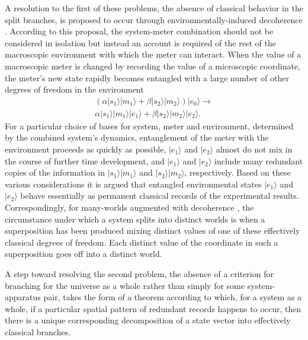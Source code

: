 \documentclass[twocolumn,amsmath,amssymb]{revtex4-1}
\begin{document}
A resolution to the first of these problems, the absence of 
classical behavior in the split branches, is proposed to occur through environmentally-induced decoherence 
\cite{Zeh, Zurek, Zurek1, Zurek2}.
According to this proposal, the system-meter combination should not be considered in isolation
but instead an account is required of the rest of the macroscopic environment with which the meter can interact.
When the value of a macroscopic meter is changed by recording the value of a microscopic coordinate, the meter's new state
rapidly becomes entangled with a large number of other degrees of freedom in the environment 
\begin{multline}
\label{entangled}
(\alpha |s_1 \rangle  |m_1 \rangle  + \beta |s_2 \rangle  |m_2 \rangle ) |e_0 \rangle  \rightarrow \\
\alpha|s_1 \rangle  |m_1 \rangle  |e_1 \rangle  +  \beta |s_2 \rangle  |m_2 \rangle  |e_2 \rangle . 
\end{multline}
For a particular choice of bases for system, meter and environment, determined by the combined system's dynamics, entanglement
of the meter with the environment proceeds as quickly as possible,
$| e_1 \rangle $ and $| e_2 \rangle $ almost do not mix in the course of further time development,
and $|e_1 \rangle $ and $|e_2 \rangle $ include many redundant copies
of the information in $|s_1 \rangle  |m_1 \rangle $ and $|s_2 \rangle  |m_2 \rangle $, respectively.
Based on these various considerations it is argued that entangled environmental states
$|e_1 \rangle $ and $|e_2 \rangle $
behave essentially as permanent classical records of the experimental results.
Correspondingly, for many-worlds augmented with decoherence \cite{Wallace}, the circumstance 
under which a system splits into distinct worlds is when a superposition
has been produced mixing distinct values of one of these effectively classical 
degrees of freedom. Each distinct value of the coordinate in such a superposition
goes off into a distinct world. 

A step toward resolving the second problem, the absence of a criterion for branching
for the universe as a whole rather than simply for some system-apparatus pair, takes the form
of a theorem \cite{Riedel} according to which, for a system as a whole, 
if a particular spatial pattern of redundant records happens to occur,
then there is a unique corresponding decomposition of a state vector into effectively
classical branches.
\end{document}
